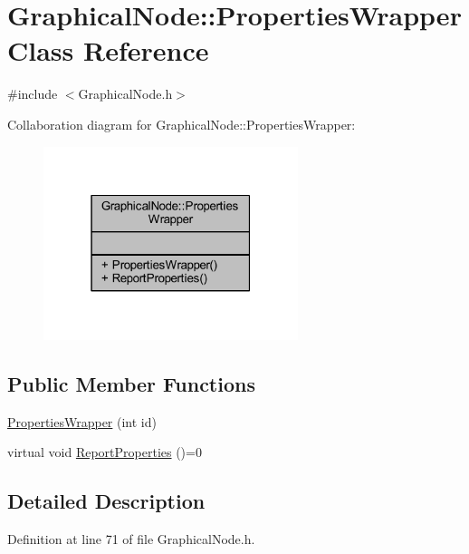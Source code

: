 \hypertarget{class_graphical_node_1_1_properties_wrapper}{}\section{Graphical\+Node\+:\+:Properties\+Wrapper Class Reference}
\label{class_graphical_node_1_1_properties_wrapper}


{\ttfamily \#include $<$Graphical\+Node.\+h$>$}



Collaboration diagram for Graphical\+Node\+:\+:Properties\+Wrapper\+:
\nopagebreak
\begin{figure}[H]
\begin{center}
\leavevmode
\includegraphics[width=211pt]{class_graphical_node_1_1_properties_wrapper__coll__graph}
\end{center}
\end{figure}
\subsection*{Public Member Functions}
\begin{DoxyCompactItemize}
\item 
\hyperlink{class_graphical_node_1_1_properties_wrapper_a881a85957ce2bc80f662bc3561e3e80a}{Properties\+Wrapper} (int id)
\item 
virtual void \hyperlink{class_graphical_node_1_1_properties_wrapper_a5283fccb2fe983af81f955509294d017}{Report\+Properties} ()=0
\end{DoxyCompactItemize}


\subsection{Detailed Description}


Definition at line 71 of file Graphical\+Node.\+h.



